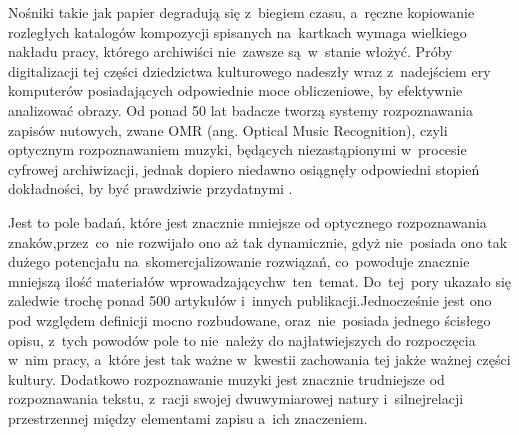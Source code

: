 \documentclass[xodstep]{wnspt}
\begin{document}
Nośniki takie jak papier degradują się z~biegiem czasu, a~ręczne kopiowanie rozległych katalogów kompozycji spisanych na~kartkach wymaga wielkiego nakładu pracy, którego archiwiści nie~zawsze są~w~stanie włożyć. Próby digitalizacji tej części dziedzictwa kulturowego nadeszły wraz z~nadejściem ery komputerów posiadających odpowiednie moce obliczeniowe, by efektywnie analizować obrazy. Od ponad 50 lat badacze tworzą systemy rozpoznawania zapisów nutowych, zwane OMR (ang. Optical Music Recognition), czyli optycznym rozpoznawaniem muzyki, będących niezastąpionymi w~procesie cyfrowej archiwizacji, jednak dopiero niedawno osiągnęły odpowiedni stopień dokładności, by być prawdziwie przydatnymi \cite{Hajicjr.2018}. 

Jest to pole badań, które jest znacznie mniejsze od optycznego rozpoznawania znaków,\linebreak przez~co~nie rozwijało ono aż tak dynamicznie, gdyż nie~posiada ono tak dużego potencjału na~skomercjalizowanie rozwiązań, co~powoduje znacznie mniejszą ilość materiałów wprowadzających\linebreak w~ten~temat. Do~tej~pory ukazało się zaledwie trochę ponad 500 artykułów i~innych publikacji.\linebreak Jednocześnie jest ono pod względem definicji mocno rozbudowane, oraz~nie~posiada jednego ścisłego opisu, z~tych powodów pole to nie~należy do najłatwiejszych do rozpoczęcia w~nim pracy\cite{Calvo-Zaragoza2020}, a~które jest tak ważne w~kwestii zachowania tej jakże ważnej części kultury. Dodatkowo rozpoznawanie muzyki jest znacznie trudniejsze od rozpoznawania tekstu, z~racji swojej dwuwymiarowej natury i~silnej\linebreak relacji przestrzennej między elementami zapisu a~ich znaczeniem.

\newpage
\end{document}
